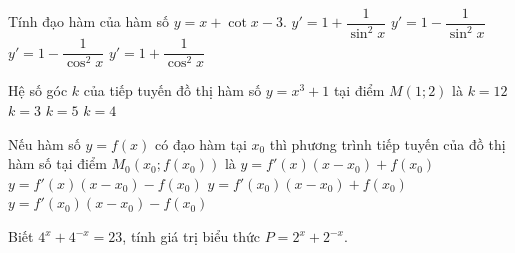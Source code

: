 \begin{ex}%
	Tính đạo hàm  của hàm số $y=x+\cot x-3 $.
	\choice 
		{$y'=1+\dfrac 1{\sin^2x}$} 
		 {\True $y'=1-\dfrac 1{\sin^2x}$}
		{$y'=1-\dfrac 1{\cos^2x}$} 
		{$y'=1+\dfrac  1{\cos^2x}$}
\end{ex}

\begin{ex}%
	Hệ số góc $k$ của tiếp tuyến  đồ thị hàm số $y = x^3 + 1$ tại điểm $M(1; 2)$ là
	 \choice
		 {$k = 12$}
		 {\True $k = 3$}
		 {$k = 5$}
		{$k  = 4$}
\end{ex}

\begin{ex}%
	Nếu hàm số $y=f\left( {x} \right)$ có đạo hàm tại  $x_0$ thì phương trình tiếp tuyến của đồ thị hàm số tại điểm $M_0\left( {x_0;f\left( {x_0} \right)} \right)$ là
	 \choice
		 {$y=f'\left( {x} \right)\left( {x-x_0} \right)+f\left( {x_0} \right)$}
		{$y=f'\left( {x}  \right)\left( {x-x_0} \right)-f\left( {x_0} \right)$}
		{\True $y=f'\left(  {x_0} \right)\left( {x-x_0} \right)+f\left( {x_0} \right)$}
		{$y=f'\left( {x_0} \right)\left(  {x-x_0} \right)-f\left( {x_0} \right)$}
\end{ex}

\begin{bt}%
	Biết  $4^x+4^{-x}=23$, tính giá trị biểu thức $P=2^x+2^{-x}$.
\end{bt}

